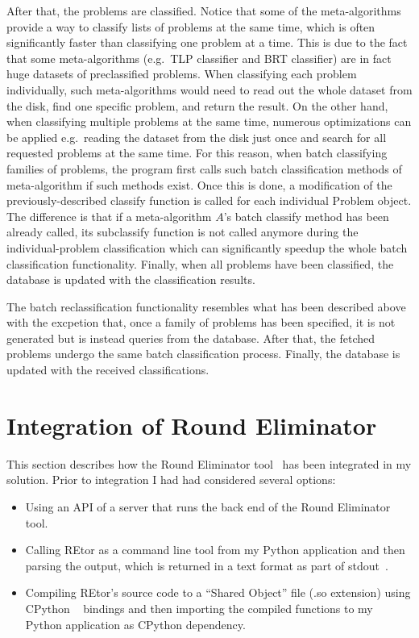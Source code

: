 After that, the problems are classified. Notice that
some of the meta-algorithms provide a way to classify
lists of problems at the same time, which is often
significantly faster than classifying one problem at a time.
This is due to the fact that some meta-algorithms
(e.g.\ TLP classifier and BRT classifier) are in fact
huge datasets of preclassified problems. When
classifying each problem individually, such
meta-algorithms would need to read out the whole
dataset from the disk, find one specific problem,
and return the result. On the other hand, when
classifying multiple problems at the same time,
numerous optimizations can be applied e.g.\ reading the 
dataset from the disk just once and search for all
requested problems at the same time. For this reason,
when batch classifying families of problems, the program first
calls such batch classification methods of meta-algorithm
if such methods exist. Once this is done, a modification
of the previously-described classify function is called
for each individual Problem object. The difference is
that if a meta-algorithm $A$'s batch classify method has been
already called, its subclassify function is not called
anymore during the individual-problem classification which
can significantly speedup the whole batch classification
functionality. Finally, when all problems have been classified,
the database is updated with the classification results.

The batch reclassification functionality resembles
what has been described above with the excpetion that,
once a family of problems has been specified, it is
not generated but is instead queries from the database.
After that, the fetched problems undergo the same
batch classification process. Finally, the database is
updated with the received classifications.

\section{Integration of Round Eliminator}

This section describes how the Round Eliminator
tool~\cite{Olivetti2020} has been integrated in my solution.
Prior to integration I had had considered several options:

\begin{itemize}
  \item Using an API of a server that runs the back end of the Round Eliminator tool.
  \item Calling REtor as a command line tool from my Python
  application and then parsing the output, which is returned
  in a text format as part of stdout~\cite{stdio}.
  \item Compiling REtor's source code to a ``Shared Object'' file (.so extension)
  using CPython ~\cite{CPython} bindings and then importing the compiled
  functions to my Python application as CPython dependency.
\end{itemize}

